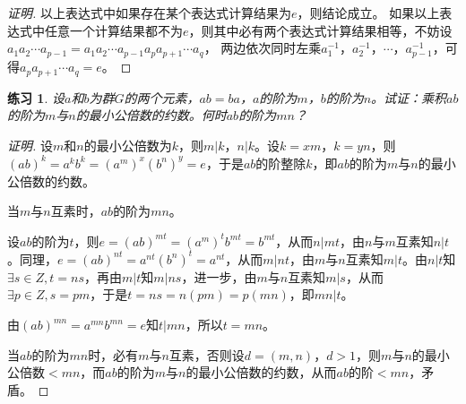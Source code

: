 \documentclass{article}
\newtheorem{Exercise}{练习}
\begin{document}
\begin{CJK*}{UTF8}{gbsn}
\begin{proof}[证明]
  以上表达式中如果存在某个表达式计算结果为$e$，则结论成立。
如果以上表达式中任意一个计算结果都不为$e$，则其中必有两个表达式计算结果相等，不妨设$a_1a_2\cdots a_{p-1} = a_1a_2\cdots a_{p-1}a_p a_{p+1}\cdots a_q$，
两边依次同时左乘$a_1^{-1}$，$a_2^{-1}$，$\cdots$，$a_{p-1}^{-1}$，可得$a_pa_{p+1}\cdots a_q=e$。

\end{proof}
\begin{Exercise}
  设$a$和$b$为群$G$的两个元素，$ab=ba$，$a$的阶为$m$，$b$的阶为$n$。试证：乘积$ab$的阶为$m$与$n$的最小公倍数的约数。何时$ab$的阶为$mn$？
\end{Exercise}
\begin{proof}[证明]
  设$m$和$n$的最小公倍数为$k$，则$m|k$，$n|k$。设$k=xm$，$k=yn$，则$(ab)^k=a^kb^k=(a^m)^x(b^n)^y=e$，于是$ab$的阶整除$k$，即$ab$的阶为$m$与$n$的最小公倍数的约数。

  当$m$与$n$互素时，$ab$的阶为$mn$。


  设$ab$的阶为$t$，则$e=(ab)^{mt}=(a^m)^tb^{mt}=b^{mt}$，从而$n|mt$，由$n$与$m$互素知$n|t$。同理，$e=(ab)^{nt}=a^{nt}(b^n)^t=a^{nt}$，从而$m|nt$，由$m$与$n$互素知$m|t$。由$n|t$知$\exists s\in Z,t=ns$，再由$m|t$知$m|ns$，进一步，由$m$与$n$互素知$m|s$，从而$\exists p\in Z,s=pm$，于是$t=ns=n(pm)=p(mn)$，即$mn|t$。

  由$(ab)^{mn}=a^{mn}b^{mn}=e$知$t|mn$，所以$t=mn$。

  当$ab$的阶为$mn$时，必有$m$与$n$互素，否则设$d=(m,n)$，$d>1$，则$m$与$n$的最小公倍数$<mn$，而$ab$的阶为$m$与$n$的最小公倍数的约数，从而$ab$的阶$<mn$，矛盾。
\end{proof}

\end{CJK*}
\end{document}
